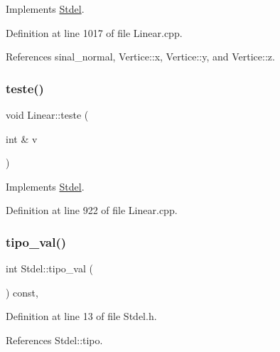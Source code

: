 Implements \hyperlink{classStdel_a4e4aa3bbd0299054ec5447bd73efc6a0}{Stdel}.



Definition at line 1017 of file Linear.\+cpp.



References sinal\+\_\+normal, Vertice\+::x, Vertice\+::y, and Vertice\+::z.

\mbox{\label{classLinear_a421345769e5a12beb28fb8d146683cf7}} 
\subsubsection{\texorpdfstring{teste()}{teste()}}
{\footnotesize\ttfamily void Linear\+::teste (\begin{DoxyParamCaption}\item[{int \&}]{v }\end{DoxyParamCaption})\hspace{0.3cm}{\ttfamily [virtual]}}



Implements \hyperlink{classStdel_ae62bc70bb31e48d165593ed1ecd482f8}{Stdel}.



Definition at line 922 of file Linear.\+cpp.

\mbox{\label{classStdel_a75023fc369db2752845a9ce278f10929}} 
\subsubsection{\texorpdfstring{tipo\+\_\+val()}{tipo\_val()}}
{\footnotesize\ttfamily int Stdel\+::tipo\+\_\+val (\begin{DoxyParamCaption}{ }\end{DoxyParamCaption}) const\hspace{0.3cm}{\ttfamily [inline]}, {\ttfamily [inherited]}}



Definition at line 13 of file Stdel.\+h.



References Stdel\+::tipo.

\mbox{\label{classLinear_abb5cb47b313459a6761d93c061d7f531}} 
